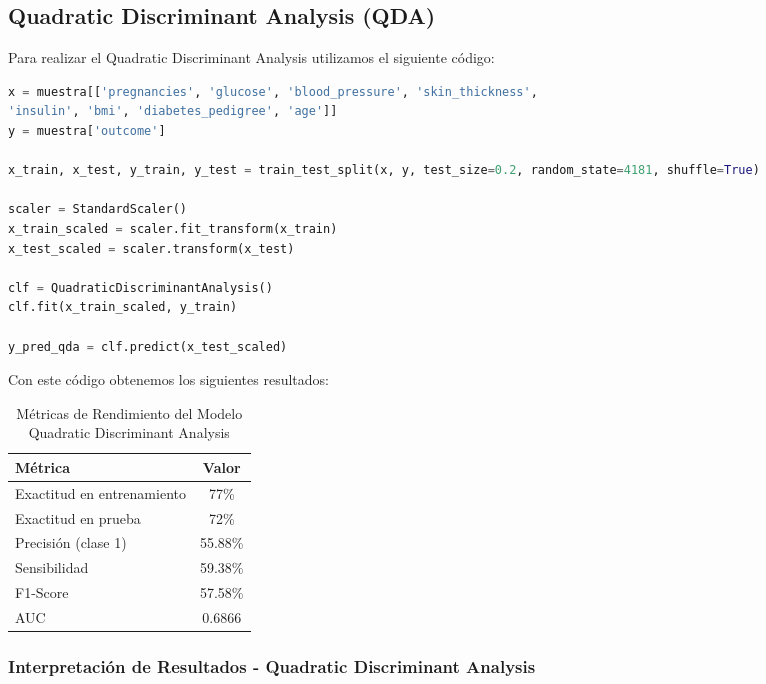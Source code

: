 \documentclass[12pt,a4paper]{article}
\begin{document}
\vspace{1cm}

\subsection{Quadratic Discriminant Analysis (QDA)}

Para realizar el Quadratic Discriminant Analysis utilizamos el siguiente código:

\begin{lstlisting}[language=Python, frame=single, basicstyle=\ttfamily\small, breaklines=true]
x = muestra[['pregnancies', 'glucose', 'blood_pressure', 'skin_thickness',
'insulin', 'bmi', 'diabetes_pedigree', 'age']]
y = muestra['outcome']

x_train, x_test, y_train, y_test = train_test_split(x, y, test_size=0.2, random_state=4181, shuffle=True)

scaler = StandardScaler()
x_train_scaled = scaler.fit_transform(x_train)
x_test_scaled = scaler.transform(x_test)

clf = QuadraticDiscriminantAnalysis()
clf.fit(x_train_scaled, y_train)

y_pred_qda = clf.predict(x_test_scaled)
\end{lstlisting}

Con este código obtenemos los siguientes resultados:

\begin{table}[H]
\centering
\caption{Métricas de Rendimiento del Modelo Quadratic Discriminant Analysis}\label{tab:qda_resultados}
\begin{tabular}{lc}
\toprule
\textbf{Métrica} & \textbf{Valor} \\
\midrule
Exactitud en entrenamiento & 77\% \\
Exactitud en prueba & 72\% \\
Precisión (clase 1) & 55.88\% \\
Sensibilidad & 59.38\% \\
F1-Score & 57.58\% \\
AUC & 0.6866 \\
\bottomrule
\end{tabular}
\end{table}

\subsubsection{Interpretación de Resultados - Quadratic Discriminant Analysis}
\end{document}
